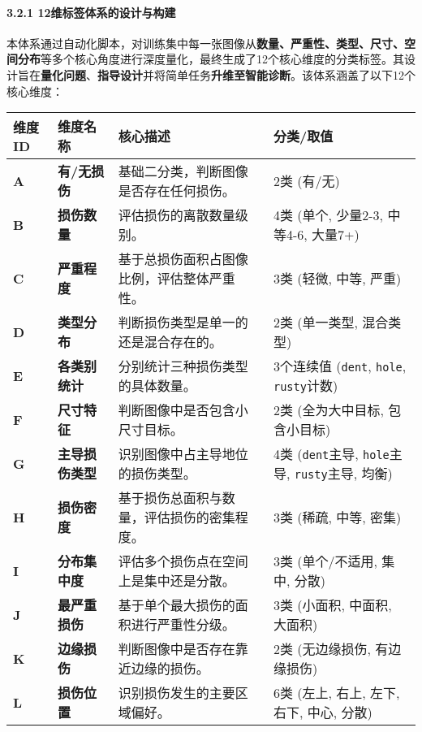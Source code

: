 \documentclass[
]{article}
\begin{document}
\paragraph{\texorpdfstring{3\textbf{.2.1
12维标签体系的设计与构建}}{3.2.1 12维标签体系的设计与构建}}\label{321-12ux7ef4ux6807ux7b7eux4f53ux7cfbux7684ux8bbeux8ba1ux4e0eux6784ux5efa}

本体系通过自动化脚本，对训练集中每一张图像从\textbf{数量、严重性、类型、尺寸、空间分布}等多个核心角度进行深度量化，最终生成了12个核心维度的分类标签。其设计旨在\textbf{量化问题}、\textbf{指导设计}并将简单任务\textbf{升维至智能诊断}。该体系涵盖了以下12个核心维度：

\begin{longtable}[]{@{}llll@{}}
\toprule\noalign{}
\textbf{维度 ID} & \textbf{维度名称} & \textbf{核心描述} &
\textbf{分类/取值} \\
\midrule\noalign{}
\endhead
\bottomrule\noalign{}
\endlastfoot
\textbf{A} & \textbf{有/无损伤} & 基础二分类，判断图像是否存在任何损伤。
& 2类 (有/无) \\
\textbf{B} & \textbf{损伤数量} & 评估损伤的离散数量级别。 & 4类 (单个,
少量2-3, 中等4-6, 大量7+) \\
\textbf{C} & \textbf{严重程度} &
基于总损伤面积占图像比例，评估整体严重性。 & 3类 (轻微, 中等, 严重) \\
\textbf{D} & \textbf{类型分布} & 判断损伤类型是单一的还是混合存在的。 &
2类 (单一类型, 混合类型) \\
\textbf{E} & \textbf{各类别统计} & 分别统计三种损伤类型的具体数量。 &
3个连续值 (\texttt{dent}, \texttt{hole}, \texttt{rusty}计数) \\
\textbf{F} & \textbf{尺寸特征} & 判断图像中是否包含小尺寸目标。 & 2类
(全为大中目标, 包含小目标) \\
\textbf{G} & \textbf{主导损伤类型} & 识别图像中占主导地位的损伤类型。 &
4类 (\texttt{dent}主导, \texttt{hole}主导, \texttt{rusty}主导, 均衡) \\
\textbf{H} & \textbf{损伤密度} &
基于损伤总面积与数量，评估损伤的密集程度。 & 3类 (稀疏, 中等, 密集) \\
\textbf{I} & \textbf{分布集中度} &
评估多个损伤点在空间上是集中还是分散。 & 3类 (单个/不适用, 集中,
分散) \\
\textbf{J} & \textbf{最严重损伤} &
基于单个最大损伤的面积进行严重性分级。 & 3类 (小面积, 中面积, 大面积) \\
\textbf{K} & \textbf{边缘损伤} & 判断图像中是否存在靠近边缘的损伤。 &
2类 (无边缘损伤, 有边缘损伤) \\
\textbf{L} & \textbf{损伤位置} & 识别损伤发生的主要区域偏好。 & 6类
(左上, 右上, 左下, 右下, 中心, 分散) \\
\end{longtable}
\end{document}
